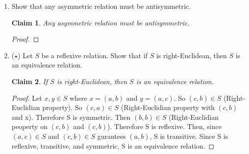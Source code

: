 \documentclass[11pt]{letter}
\newtheorem{claim}{Claim}
\theoremstyle{definition}
\begin{document}
\begin{description}
\begin{enumerate}
\begin{enumerate}
\begin{proof}
                                  \end{proof}
                                  
					
                                \item Why did we assume $A$ has at least three elements?
                                  We assumed $A$ had at least three elements because partitions $B_1$ and $B_2$ cannot be empty (by definition of partitions) and cannot overlap. Therefore there must be two elements which fill those partitions. Furthermore, since all sets contain the empty set and partitions can't contain this, we know that the empty set is in A, making a total of three elements.
				\end{enumerate}
						
			      \item Show that any asymmetric relation must be antisymmetric.
                                \begin{claim}
                                  Any asymmetric relation must be antisymmetric.
                                \end{claim}
                                \begin{proof}
                                  
                                \end{proof}
                                
                                
		
			\item ($\star$) Let $S$ be a reflexive relation. Show that if $S$ is right-Euclidean, then $S$ is an equivalence relation.
                          \begin{claim}
                            If $S$ is right-Euclidean, then $S$ is an equivalence relation.
                          \end{claim}
                          \begin{proof}
                            Let $x,y\in S$ where $x=(a,b)$ and $y=(a,c)$. So $(c,b)\in S$ (Right-Euclidian property). So  $(c,a)\in S$ (Right-Euclidian property with $(c,b)$ and x). Therefore S is symmetric. Then $(b,b)\in S$ (Right-Euclidian peoperty on $(c,b)$ and $(c,b)$). Therefore S is reflexive. Then, since $(a,c)\in S$ and $(c,b)\in S$ gurantees $(a,b)$, S is transitive. Since S is reflexive, transitive, and symmetric, S is an equivalence relation. 
                          \end{proof}
                          

\end{enumerate}
\end{description}
\end{document}
